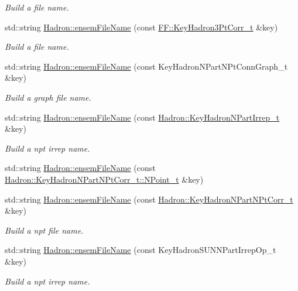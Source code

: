 \begin{DoxyCompactItemize}
\begin{DoxyCompactList}\small\item\em Build a file name. \end{DoxyCompactList}\item 
std\+::string \mbox{\hyperlink{namespaceHadron_a1043f4c7b4a30f750e2484e69ff0a25b}{Hadron\+::ensem\+File\+Name}} (const \mbox{\hyperlink{structFF_1_1KeyHadron3PtCorr__t}{F\+F\+::\+Key\+Hadron3\+Pt\+Corr\+\_\+t}} \&key)
\begin{DoxyCompactList}\small\item\em Build a file name. \end{DoxyCompactList}\item 
std\+::string \mbox{\hyperlink{namespaceHadron_a427c61121d387abc689b090161709921}{Hadron\+::ensem\+File\+Name}} (const Key\+Hadron\+N\+Part\+N\+Pt\+Conn\+Graph\+\_\+t \&key)
\begin{DoxyCompactList}\small\item\em Build a graph file name. \end{DoxyCompactList}\item 
std\+::string \mbox{\hyperlink{namespaceHadron_a21a0c1cea8de6f0c457f10e22cd3d251}{Hadron\+::ensem\+File\+Name}} (const \mbox{\hyperlink{structHadron_1_1KeyHadronNPartIrrep__t}{Hadron\+::\+Key\+Hadron\+N\+Part\+Irrep\+\_\+t}} \&key)
\begin{DoxyCompactList}\small\item\em Build a npt irrep name. \end{DoxyCompactList}\item 
std\+::string \mbox{\hyperlink{namespaceHadron_ac1f8513c22ed958fc79537d0cfc00e1f}{Hadron\+::ensem\+File\+Name}} (const \mbox{\hyperlink{structHadron_1_1KeyHadronNPartNPtCorr__t_1_1NPoint__t}{Hadron\+::\+Key\+Hadron\+N\+Part\+N\+Pt\+Corr\+\_\+t\+::\+N\+Point\+\_\+t}} \&key)
\item 
std\+::string \mbox{\hyperlink{namespaceHadron_a8e1d2864f30c4b930840948366f8f356}{Hadron\+::ensem\+File\+Name}} (const \mbox{\hyperlink{structHadron_1_1KeyHadronNPartNPtCorr__t}{Hadron\+::\+Key\+Hadron\+N\+Part\+N\+Pt\+Corr\+\_\+t}} \&key)
\begin{DoxyCompactList}\small\item\em Build a npt file name. \end{DoxyCompactList}\item 
std\+::string \mbox{\hyperlink{namespaceHadron_abd79d5d930df3781c0e12f1335c4b86e}{Hadron\+::ensem\+File\+Name}} (const Key\+Hadron\+S\+U\+N\+N\+Part\+Irrep\+Op\+\_\+t \&key)
\begin{DoxyCompactList}\small\item\em Build a npt irrep name. \end{DoxyCompactList}\item 

\end{DoxyCompactItemize}
